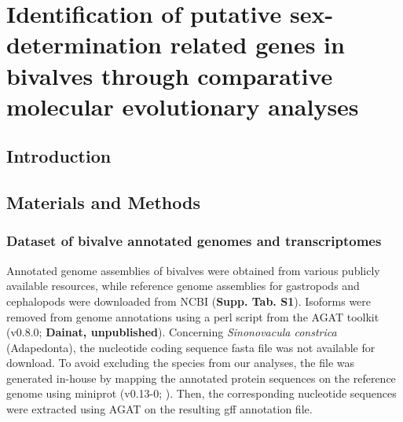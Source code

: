 \documentclass[../main.tex]{subfiles}
\begin{document}
{
\chapter{Identification of putative sex-determination related genes in bivalves through comparative molecular evolutionary analyses}
\label{molecularEvolution}


\vspace{5mm}




\vspace{5mm}

}

\newpage

\section{Introduction} \label{chapter3_introduction}

\section{Materials and Methods} \label{chpater3_MM}
\subsection{Dataset of bivalve annotated genomes and transcriptomes}
Annotated genome assemblies of bivalves were obtained from various publicly available resources, while reference genome assemblies for gastropods and cephalopods were downloaded from NCBI (\textbf{Supp. Tab. S1}). Isoforms were removed from genome annotations using a perl script from the AGAT toolkit (v0.8.0; \textbf{Dainat, unpublished}). Concerning \textit{Sinonovacula constrica} (Adapedonta), the nucleotide coding sequence fasta file was not available for download. To avoid excluding the species from our analyses, the file was generated in-house by mapping the annotated protein sequences on the reference genome using miniprot (v0.13-0; \textbf{\cite{li2023miniprot}}). Then, the corresponding nucleotide sequences were extracted using AGAT on the resulting gff annotation file.
\end{document}
